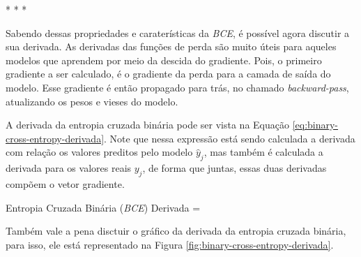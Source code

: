 \medskip
\begin{center}
 * * *
\end{center}
\medskip

Sabendo dessas propriedades e caraterísticas da \textit{BCE}, é possível agora discutir a sua derivada. As derivadas das funções de perda são muito úteis para aqueles modelos que aprendem por meio da descida do gradiente. Pois, o primeiro gradiente a ser calculado, é o gradiente da perda para a camada de saída do modelo. Esse gradiente é então propagado para trás, no chamado \textit{backward-pass}, atualizando os pesos e vieses do modelo.

A derivada da entropia cruzada binária pode ser vista na Equação \ref{eq:binary-cross-entropy-derivada}. Note que nessa expressão está sendo calculada a derivada com relação os valores preditos pelo modelo $\hat{y}_j$, mas também é calculada a derivada para os valores reais $y_j$, de forma que juntas, essas duas derivadas compõem o vetor gradiente.

\begin{equacaodestaque}{Entropia Cruzada Binária (\textit{BCE}) Derivada}
     = 
    \label{eq:binary-cross-entropy-derivada}
\end{equacaodestaque}

Também vale a pena disctuir o gráfico da derivada da entropia cruzada binária, para isso, ele está representado na Figura \ref{fig:binary-cross-entropy-derivada}.

